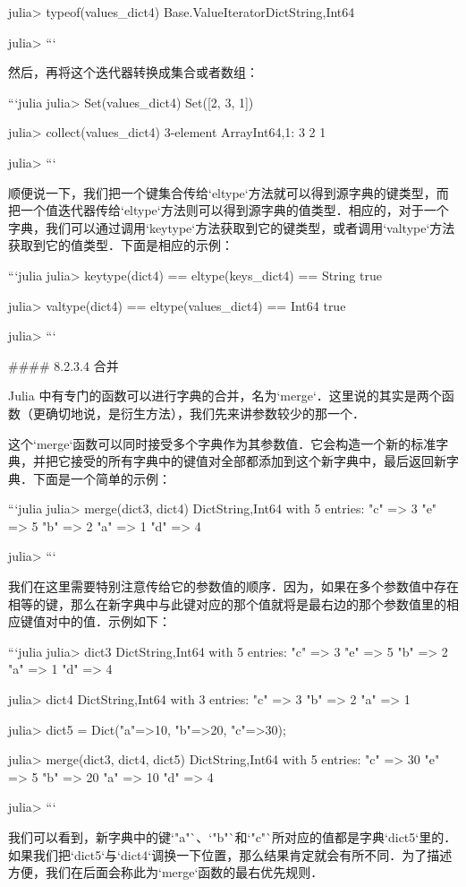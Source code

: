 julia> typeof(values_dict4)
Base.ValueIterator{Dict{String,Int64}}

julia> 
```

然后，再将这个迭代器转换成集合或者数组：

```julia
julia> Set(values_dict4)
Set([2, 3, 1])

julia> collect(values_dict4)
3-element Array{Int64,1}:
 3
 2
 1

julia>
```

顺便说一下，我们把一个键集合传给`eltype`方法就可以得到源字典的键类型，而把一个值迭代器传给`eltype`方法则可以得到源字典的值类型．相应的，对于一个字典，我们可以通过调用`keytype`方法获取到它的键类型，或者调用`valtype`方法获取到它的值类型．下面是相应的示例：

```julia 
julia> keytype(dict4) == eltype(keys_dict4) == String
true

julia> valtype(dict4) == eltype(values_dict4) == Int64
true

julia> 
```

#### 8.2.3.4 合并

Julia 中有专门的函数可以进行字典的合并，名为`merge`．这里说的其实是两个函数（更确切地说，是衍生方法），我们先来讲参数较少的那一个．

这个`merge`函数可以同时接受多个字典作为其参数值．它会构造一个新的标准字典，并把它接受的所有字典中的键值对全部都添加到这个新字典中，最后返回新字典．下面是一个简单的示例：

```julia
julia> merge(dict3, dict4)
Dict{String,Int64} with 5 entries:
  "c" => 3
  "e" => 5
  "b" => 2
  "a" => 1
  "d" => 4

julia> 
```

我们在这里需要特别注意传给它的参数值的顺序．因为，如果在多个参数值中存在相等的键，那么在新字典中与此键对应的那个值就将是最右边的那个参数值里的相应键值对中的值．示例如下：

```julia
julia> dict3
Dict{String,Int64} with 5 entries:
  "c" => 3
  "e" => 5
  "b" => 2
  "a" => 1
  "d" => 4

julia> dict4
Dict{String,Int64} with 3 entries:
  "c" => 3
  "b" => 2
  "a" => 1

julia> dict5 = Dict("a"=>10, "b"=>20, "c"=>30);

julia> merge(dict3, dict4, dict5)
Dict{String,Int64} with 5 entries:
  "c" => 30
  "e" => 5
  "b" => 20
  "a" => 10
  "d" => 4

julia> 
```

我们可以看到，新字典中的键`"a"`、`"b"`和`"c"`所对应的值都是字典`dict5`里的．如果我们把`dict5`与`dict4`调换一下位置，那么结果肯定就会有所不同．为了描述方便，我们在后面会称此为`merge`函数的最右优先规则．

